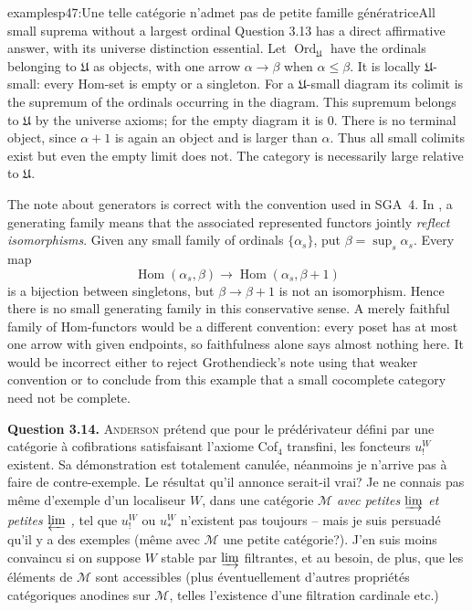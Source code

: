 \begin{dcomment}{examples}{p47:Une telle catégorie n'admet pas de petite famille génératrice}{All small suprema without a largest ordinal}
Question 3.13 has a direct affirmative answer, with its universe distinction essential. Let $\operatorname{Ord}_{\mathfrak U}$ have the ordinals belonging to $\mathfrak U$ as objects, with one arrow $\alpha\to\beta$ when $\alpha\leq\beta$. It is locally $\mathfrak U$-small: every Hom-set is empty or a singleton. For a $\mathfrak U$-small diagram its colimit is the supremum of the ordinals occurring in the diagram. This supremum belongs to $\mathfrak U$ by the universe axioms; for the empty diagram it is $0$. There is no terminal object, since $\alpha+1$ is again an object and is larger than $\alpha$. Thus all small colimits exist but even the empty limit does not. The category is necessarily large relative to $\mathfrak U$.

The note about generators is correct with the convention used in SGA~4. In \citet[Expos\'e~I, 7.1]{SGA4I1972}, a generating family means that the associated represented functors jointly \emph{reflect isomorphisms}. Given any small family of ordinals $\{\alpha_s\}$, put $\beta=\sup_s\alpha_s$. Every map
\[
 \operatorname{Hom}(\alpha_s,\beta)
 \longrightarrow\operatorname{Hom}(\alpha_s,\beta+1)
\]
is a bijection between singletons, but $\beta\to\beta+1$ is not an isomorphism. Hence there is no small generating family in this conservative sense. A merely faithful family of Hom-functors would be a different convention: every poset has at most one arrow with given endpoints, so faithfulness alone says almost nothing here. It would be incorrect either to reject Grothendieck's note using that weaker convention or to conclude from this example that a small cocomplete category need not be complete.
\end{dcomment}


\textbf{Question 3.14.} \textsc{Anderson} prétend que pour le prédérivateur défini par une catégorie à cofibrations satisfaisant l'axiome Cof$_4$ transfini, les foncteurs $u_!^W$ existent. Sa démonstration est totalement canulée, néanmoins je n'arrive pas à faire de contre-exemple. Le résultat qu'il annonce serait-il vrai? Je ne connais pas même d'exemple d'un localiseur $W$, dans une catégorie $\mathcal{M}$ \textit{avec petites $\varinjlim$ et petites $\varprojlim$ ,} tel que $u_!^W$ ou $u_*^W$ n'existent pas toujours -- mais je suis persuadé qu'il y a des exemples (même avec $\mathcal{M}$ une petite catégorie?). J'en suis moins convaincu si on suppose $W$ stable par $\varinjlim$ filtrantes, et au besoin, de plus, que les éléments de $\mathcal{M}$ sont accessibles (plus éventuellement d'autres propriétés catégoriques anodines sur $\mathcal{M}$, telles l'existence d'une filtration
cardinale etc.)

